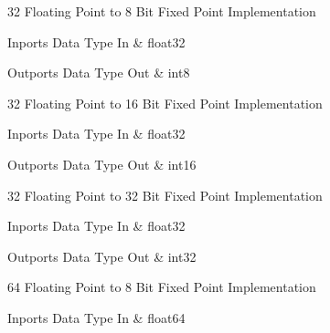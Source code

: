 \nopagebreak[0]

32 Floating Point to 8 Bit Fixed Point Implementation

\begin{XtoCtabular}{Inports Data Type}
In & float32\tabularnewline
\hline
\end{XtoCtabular}

\begin{XtoCtabular}{Outports Data Type}
Out & int8\tabularnewline
\hline
\end{XtoCtabular}

\ifdefined \AddTestReports
{}
\fi
{}
\nopagebreak[0]

32 Floating Point to 16 Bit Fixed Point Implementation

\begin{XtoCtabular}{Inports Data Type}
In & float32\tabularnewline
\hline
\end{XtoCtabular}

\begin{XtoCtabular}{Outports Data Type}
Out & int16\tabularnewline
\hline
\end{XtoCtabular}

\ifdefined \AddTestReports
{}
\fi
{}
\nopagebreak[0]

32 Floating Point to 32 Bit Fixed Point Implementation

\begin{XtoCtabular}{Inports Data Type}
In & float32\tabularnewline
\hline
\end{XtoCtabular}

\begin{XtoCtabular}{Outports Data Type}
Out & int32\tabularnewline
\hline
\end{XtoCtabular}

\ifdefined \AddTestReports
{}
\fi
{}
\nopagebreak[0]

64 Floating Point to 8 Bit Fixed Point Implementation

\begin{XtoCtabular}{Inports Data Type}
In & float64\tabularnewline
\hline
\end{XtoCtabular}

